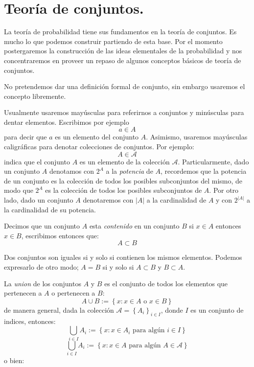 \documentclass[14pt]{extbook}
\begin{document}
\chapter{Teoría de conjuntos.}

La teoría de probabilidad tiene sus fundamentos en la teoría de conjuntos. Es mucho lo que podemos construir partiendo de esta base. Por el momento postergaremos la construcción de las ideas elementales de la probabilidad y nos concentraremos en proveer un repaso de algunos conceptos básicos de teoría de conjuntos.

No pretendemos dar una definición formal de conjunto, sin embargo usaremos el concepto libremente. 


Usualmente usaremos mayúsculas para referirnos a conjuntos y minúsculas para dentar elementos. Escribimos por ejemplo
$$
a \in A 
$$
para decir que $a$ es un elemento del conjunto $A$. Asimismo, usaremos mayúsculas caligráficas para denotar colecciones de conjuntos. Por ejemplo:
$$
A\in \mathcal{A}
$$
indica que el conjunto $A$ es un elemento de la colección $\mathcal{A}$.
Particularmente, dado un conjunto $A$ denotamos con $2^A$ a la \emph{potencia} de $A$, recordemos que la potencia de un conjunto es la colección de todos los posibles subconjuntos del mismo, de modo que $2^A$ es la colección de todos los posibles subconjuntos de $A$. Por otro lado, dado un conjunto $A$ denotaremos con $\vert A \vert$ a la cardinalidad de $A$ y con $2^{\vert A \vert}$ a la cardinalidad de su potencia.


Decimos que un conjunto $A$ esta \emph{contenido} en un conjunto $B$ si $x\in A$ entonces $x \in B$, escribimos entonces que:
$$
A\subset B
$$

Dos conjuntos son iguales si y solo si contienen los mismos elementos. Podemos expresarlo de otro modo; $A = B$ si y solo si $A\subset B$ y $B \subset A$.

La \emph{union} de los conjuntos $A$ y $B$ es el conjunto de todos los elementos que pertenecen a $A$ o pertenecen a $B$:
$$
A\cup B := \left\{x: x \in A \text{ o } x \in B\right\}
$$
de manera general, dada la colección $\mathcal{A} = \left\{A_i\right\}_{i\in I}$, donde $I$ es un conjunto de indices, entonces:
$$
\bigcup_{i\in I}A_i := \left\{x: x \in A_i \text{ para algún } i\in I \right\}
$$
$$
\bigcup_{i\in I}A_i := \left\{x: x \in A \text{ para algún } A\in \mathcal{A} \right\}
$$
o bien:
\end{document}
